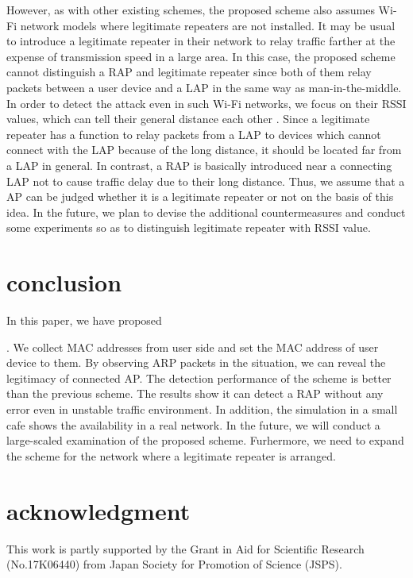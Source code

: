 \documentclass[conference]{IEEEtran}
\begin{document}
However, as with other existing schemes, the proposed scheme also assumes Wi-Fi network models where legitimate repeaters are not installed.
It may be usual to introduce a legitimate repeater in their network to relay traffic farther at the expense of transmission speed in a large area.
In this case, the proposed scheme cannot distinguish a RAP and legitimate repeater since both of them relay packets between a user device and a LAP in the same way as man-in-the-middle.
In order to detect the attack even in such Wi-Fi networks, we focus on their RSSI values, which can tell their general distance each other \cite{rssi}.
Since a legitimate repeater has a function to relay packets from a LAP to devices which cannot connect with the LAP because of the long distance, it should be located far from a LAP in general.
In contrast, a RAP is basically introduced near a connecting LAP not to cause traffic delay due to their long distance.
Thus, we assume that a AP can be judged whether it is a legitimate repeater or not on the basis of this idea.
In the future, we plan to devise the additional countermeasures and conduct some experiments so as to distinguish legitimate repeater with RSSI value.

\section{conclusion}\label{sec:6}
In this paper, we have proposed \title{}.
We collect MAC addresses from user side and set the MAC address of user device to them.
By observing ARP packets in the situation, we can reveal the legitimacy of connected AP.
The detection performance of the scheme is better than the previous scheme.
The results show it can detect a RAP without any error even in unstable traffic environment.
In addition, the simulation in a small cafe shows the availability in a real network.
In the future, we will conduct a large-scaled examination of the proposed scheme.
Furhermore, we need to expand the scheme for the network where a legitimate repeater is arranged.

\section*{acknowledgment}
This work is partly supported by the Grant in Aid for Scientific Research (No.17K06440) from Japan Society for Promotion of Science (JSPS).



\vspace{12pt}
\end{document}
